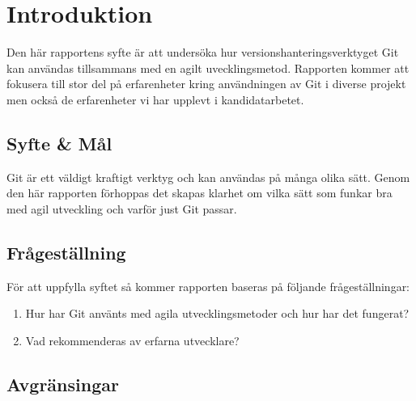\section{Introduktion}
\label{sec:bjorn-introduction}
Den här rapportens syfte är att undersöka hur versionshanteringsverktyget Git kan användas tillsammans med en agilt uvecklingsmetod. Rapporten kommer att fokusera till stor del på erfarenheter kring användningen av Git i diverse projekt men också de erfarenheter vi har upplevt i kandidatarbetet.

\subsection{Syfte \& Mål}
\label{subsec:motivation}

Git är ett väldigt kraftigt verktyg och kan användas på många olika sätt. Genom den här rapporten förhoppas det skapas klarhet om vilka sätt som funkar bra med agil utveckling och varför just Git passar.

\subsection{Frågeställning}
\label{subsec:research-questions}

För att uppfylla syftet så kommer rapporten baseras på följande frågeställningar:

\begin{enumerate}
\item Hur har Git använts med agila utvecklingsmetoder och hur har det fungerat?

\item Vad rekommenderas av erfarna utvecklare?

\end{enumerate}

\subsection{Avgränsingar}
\label{subsec:delimitations}

